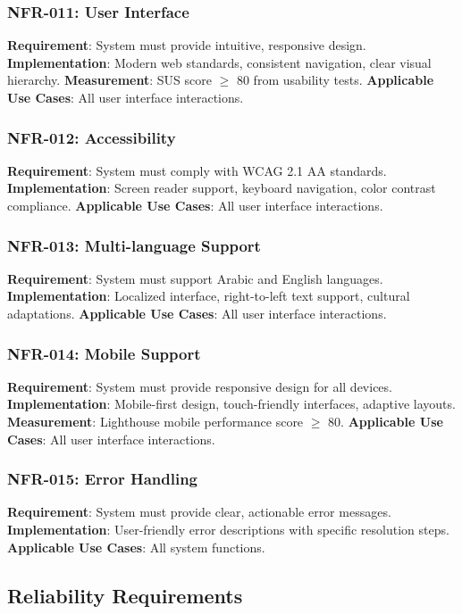 \documentclass[12pt,a4paper]{article}
\begin{document}
\subsubsection{NFR-011: User Interface}
\textbf{Requirement}: System must provide intuitive, responsive design.
\textbf{Implementation}: Modern web standards, consistent navigation, clear visual hierarchy.
\textbf{Measurement}: SUS score \(\geq\) 80 from usability tests.
\textbf{Applicable Use Cases}: All user interface interactions.

\subsubsection{NFR-012: Accessibility}
\textbf{Requirement}: System must comply with WCAG 2.1 AA standards.
\textbf{Implementation}: Screen reader support, keyboard navigation, color contrast compliance.
\textbf{Applicable Use Cases}: All user interface interactions.

\subsubsection{NFR-013: Multi-language Support}
\textbf{Requirement}: System must support Arabic and English languages.
\textbf{Implementation}: Localized interface, right-to-left text support, cultural adaptations.
\textbf{Applicable Use Cases}: All user interface interactions.

\subsubsection{NFR-014: Mobile Support}
\textbf{Requirement}: System must provide responsive design for all devices.
\textbf{Implementation}: Mobile-first design, touch-friendly interfaces, adaptive layouts.
\textbf{Measurement}: Lighthouse mobile performance score \(\geq\) 80.
\textbf{Applicable Use Cases}: All user interface interactions.

\subsubsection{NFR-015: Error Handling}
\textbf{Requirement}: System must provide clear, actionable error messages.
\textbf{Implementation}: User-friendly error descriptions with specific resolution steps.
\textbf{Applicable Use Cases}: All system functions.

\subsection{Reliability Requirements}
\end{document}

